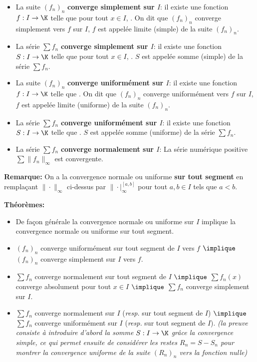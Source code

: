 \smallskip

\begin{itemize}
  \setlength\itemsep{0.6em}
\item La suite $(f_n)_n$ \textbf{converge simplement sur $I$}: il existe
  une fonction $f:I\to\K$ telle que pour tout $x\in I$,
  . On dit que $(f_n)_n$ converge
  simplement vers $f$ sur $I$, $f$ est appelée limite (simple) de la
  suite $(f_n)_n$.
\item La série $\sum f_n$ \textbf{converge simplement sur $I$}: il existe
  une fonction $S:I\to\K$ telle que pour tout $x\in I$,
  . $S$ est appelée somme (simple) de la
  série $\sum f_n$.
\item La suite $(f_n)_n$ \textbf{converge uniformément sur $I$}: il existe
  une fonction $f:I\to\K$ telle que
  . On dit que $(f_n)_n$ converge
  uniformément vers $f$ sur $I$, $f$ est appelée limite (uniforme) de la
  suite $(f_n)_n$.

\item La série $\sum f_n$ \textbf{converge uniformément sur $I$}: il existe
  une fonction $S:I\to\K$ telle que
  . $S$ est appelée somme (uniforme) de la
  série $\sum f_n$.

\item La série $\sum f_n$ \textbf{converge normalement sur $I$}: La
  série numérique positive $\sum \|f_n\|_{\infty}$ est convergente.

\end{itemize}

\smallskip


{\bfseries Remarque:} On a la convergence normale ou uniforme \textbf{sur
  tout segment} en remplaçant $\|\cdot\|_{\infty}$ ci-dessus par
$\|\cdot|_{\infty}^{[a,b]}$ pour tout $a,b\in I$ tels que $a<b$.


\smallskip




{\bfseries Théorèmes:}
\begin{itemize}
  \setlength\itemsep{0.6em}
\item De façon générale la convergence normale ou uniforme sur $I$
  implique la convergence normale ou uniforme sur tout segment.
\item $(f_n)_n$ converge uniformément sur tout segment de $I$ vers $f$ $\implique$
  $(f_n)_n$ converge simplement sur $I$ vers $f$.
\item $\sum f_n$ converge normalement sur tout segment de $I$
  $\implique$ $\sum f_n(x)$ converge absolument pour tout $x\in I$
  $\implique$ $\sum f_n$ converge simplement sur $I$.
\item $\sum f_n$ converge normalement sur $I$ (\emph{resp.} sur tout
  segment de $I$) $\implique$ $\sum f_n$ converge uniformément sur $I$ (\emph{resp.} sur tout
  segment de $I$). {\itshape (la preuve consiste à introduire d'abord
  la somme $S:I\to\K$ grâce la convergence simple, ce qui
  permet ensuite de considérer les restes $R_n=S-S_n$ pour montrer la
  convergence uniforme de la suite $(R_n)_n$ vers la fonction nulle)}
\end{itemize}

